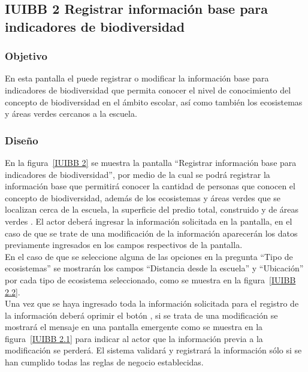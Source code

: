 \subsection{IUIBB 2 Registrar información base para indicadores de biodiversidad}

\subsubsection{Objetivo}

      En esta pantalla el  puede registrar o modificar la información base para indicadores de biodiversidad que permita conocer el nivel de conocimiento del concepto de biodiversidad en el ámbito escolar, así como también los ecosistemas y áreas verdes cercanos a la escuela.

\subsubsection{Diseño}

    En la figura~\ref{IUIBB 2} se muestra la pantalla ``Registrar información base para indicadores de biodiversidad'', por medio de la cual se podrá registrar la información base que permitirá conocer la cantidad de personas que conocen el concepto de biodiversidad, además de los ecosistemas y áreas verdes que se localizan cerca de la escuela, la superficie del predio total, construido y de áreas verdes . El actor deberá ingresar la información solicitada en la pantalla, en el caso de que se trate de una modificación de la información aparecerán los datos previamente ingresados en los campos respectivos de la pantalla.\\
    
    En el caso de que se seleccione alguna de las opciones en la pregunta ``Tipo de ecosistemas'' se mostrarán los campos ``Distancia desde la escuela'' y ``Ubicación'' por cada tipo de ecosistema seleccionado, como se muestra en la figura~\ref{IUIBB 2.2}. \\
    
    Una vez que se haya ingresado toda la información solicitada para el registro de la información deberá oprimir el botón , si se trata de una modificación se mostrará el mensaje  en una pantalla emergente como se muestra en la figura~\ref{IUIBB 2.1} para indicar al actor que la información previa a la modificación se perderá. El sistema validará y registrará la información sólo si se han cumplido todas las reglas de negocio establecidas.\\
    
